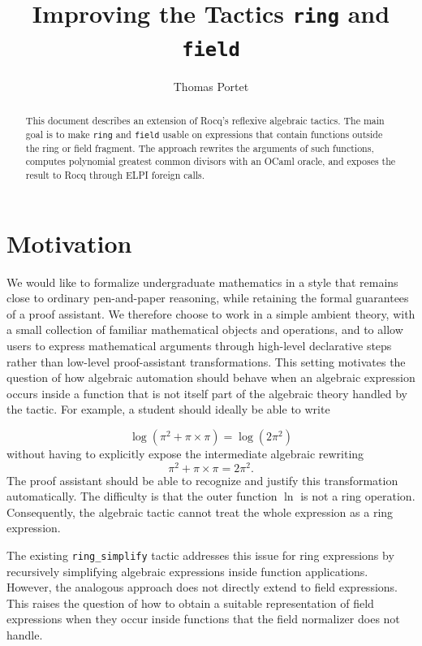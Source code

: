 \documentclass[11pt]{article}
\title{Improving the Tactics \texttt{ring} and \texttt{field}\\
 }
\author{Thomas Portet}
\begin{document}
\maketitle

\begin{abstract}
This document describes an extension of Rocq's \cite{rocq-prover} reflexive algebraic tactics. The
main goal is to make \texttt{ring} and \texttt{field} usable on expressions that
contain functions outside the ring or field fragment. The approach rewrites the
arguments of such functions, computes polynomial greatest common divisors with
an OCaml oracle, and exposes the result to Rocq through ELPI foreign calls.
\end{abstract}
\section{Motivation}

We would like to formalize undergraduate mathematics in a style that remains close to ordinary pen-and-paper reasoning, while retaining the formal guarantees of a proof assistant. We therefore choose to work in a simple ambient theory, with a small collection of familiar mathematical objects and operations, and to allow users to express mathematical arguments through high-level declarative steps rather than low-level proof-assistant transformations.
\newline \newline
This setting motivates the question of how algebraic automation should behave when an algebraic expression occurs inside a function that is not itself part of the algebraic theory handled by the tactic. For example, a student should ideally be able to write

\[
\log(\pi^2+\pi\times\pi)=\log(2\pi^2)
\]
without having to explicitly expose the intermediate algebraic rewriting
\[
\pi^2+\pi\times\pi=2\pi^2.
\]
The proof assistant should be able to recognize and justify this transformation automatically.\newline
The difficulty is that the outer function $\ln$ is not a ring operation. Consequently, the algebraic tactic cannot treat the whole expression as a ring expression.

The existing \texttt{ring\_simplify} tactic addresses this issue for ring expressions by recursively simplifying algebraic expressions inside function applications.
However, the analogous approach does not directly extend to field expressions. This raises the question of how to obtain a suitable representation of field expressions when they occur inside functions that the field normalizer does not handle.
\end{document}
